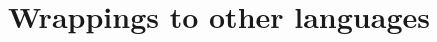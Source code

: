 \documentclass{InsightSoftwareGuide}
\newif\ifitkPrintedVersion
\begin{document}
\chapter{Wrappings to other languages}
\label{chap:wrappings}





\backmatter

%
%

% 




%
%


\end{document}
